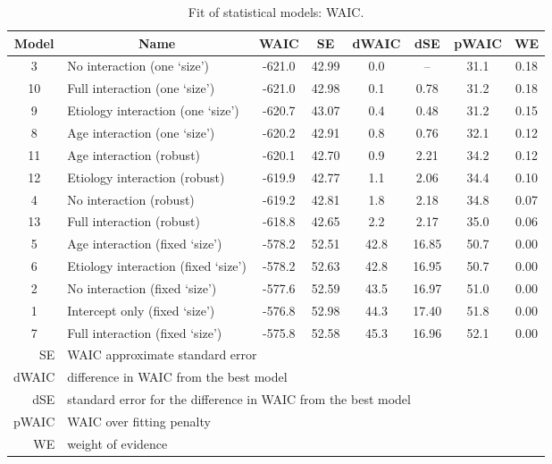 \begin{table}[h!]
	\centering
	\begin{tabular}{|c|lcccccc|} 
		\hline
		Model & \multicolumn{1}{c}{Name} & WAIC & SE & dWAIC & dSE & pWAIC & WE \\[0.5ex] 
		\hline\hline
		\rowcolor{gray}
		3 & No interaction (one `size') & -621.0 & 42.99 & 0.0 & -- & 31.1 & 0.18 \\
		10 & Full interaction (one `size') & -621.0 & 42.98 & 0.1 & 0.78 & 31.2 & 0.18 \\
		\rowcolor{gray}
		9 & Etiology interaction (one `size') & -620.7 & 43.07 & 0.4 & 0.48 & 31.2 & 0.15 \\
		8 & Age interaction (one `size') & -620.2 & 42.91 & 0.8 & 0.76 & 32.1 & 0.12 \\
		\rowcolor{gray}
		11 & Age interaction (robust) & -620.1 & 42.70 & 0.9 & 2.21 & 34.2 & 0.12 \\
		12 & Etiology interaction (robust) & -619.9 & 42.77 & 1.1 & 2.06 & 34.4 & 0.10 \\
		\rowcolor{gray}
		4 & No interaction (robust) & -619.2 & 42.81 & 1.8 & 2.18 & 34.8 & 0.07 \\
		13 & Full interaction (robust) & -618.8 & 42.65 & 2.2 & 2.17 & 35.0 & 0.06 \\
		\rowcolor{gray}
		5 & Age interaction (fixed `size') & -578.2 & 52.51 & 42.8 & 16.85 & 50.7 & 0.00 \\
		6 & Etiology interaction (fixed `size') & -578.2 & 52.63 & 42.8 & 16.95 & 50.7 & 0.00 \\
		\rowcolor{gray}
		2 & No interaction (fixed `size') & -577.6 & 52.59 & 43.5 & 16.97 & 51.0 & 0.00 \\
		1 & Intercept only (fixed `size') & -576.8 & 52.98 & 44.3 & 17.40 & 51.8 & 0.00 \\
		\rowcolor{gray}
		7 & Full interaction (fixed `size') & -575.8 & 52.58 & 45.3 & 16.96 & 52.1 & 0.00 \\
		\hline\hline
		\multicolumn{1}{|r|}{\small SE} & \multicolumn{7}{l|}{\small WAIC approximate standard error} \\
		\multicolumn{1}{|r|}{\small dWAIC} & \multicolumn{7}{l|}{\small difference in WAIC from the best model} \\
		\multicolumn{1}{|r|}{\small dSE} & \multicolumn{7}{l|}{\small standard error for the difference in WAIC from the best model} \\
		\multicolumn{1}{|r|}{\small pWAIC} & \multicolumn{7}{l|}{\small WAIC over fitting penalty} \\
		\multicolumn{1}{|r|}{\small WE} & \multicolumn{7}{l|}{\small weight of evidence} \\
		\hline
	\end{tabular}
	\caption[Fit of statistical models: WAIC]{Fit of statistical models: WAIC.}
	\label{tab:WAIC}
\end{table}
